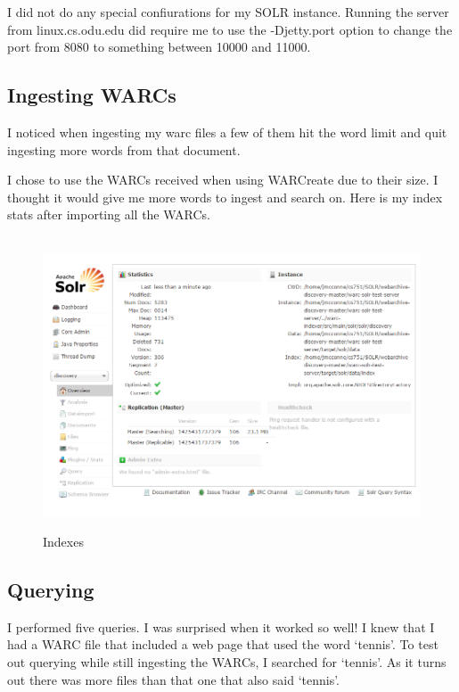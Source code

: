 \documentclass[12pt]{article}
\begin{document}
I did not do any special confiurations for my SOLR instance. Running the server from linux.cs.odu.edu did require me to use the -Djetty.port option to change the port from 8080 to something between 10000 and 11000.

\subsection{Ingesting WARCs}
I noticed when ingesting my warc files a few of them hit the word limit and quit ingesting more words from that document.

I chose to use the WARCs received when using WARCreate due to their size. I thought it would give me more words to ingest and search on.  Here is my index stats after importing all the WARCs.

\begin{figure}[H]
    \caption{Indexes}
    \centering
    \includegraphics[scale=0.5]{indexes.PNG}
\end{figure}

\subsection{Querying}

I performed five queries.  I was surprised when it worked so well! I knew that I had a WARC file that included a web page that used the word `tennis'.  To test out querying while still ingesting the WARCs, I searched for `tennis'. As it turns out there was more files than that one that also said `tennis'.
\end{document}
